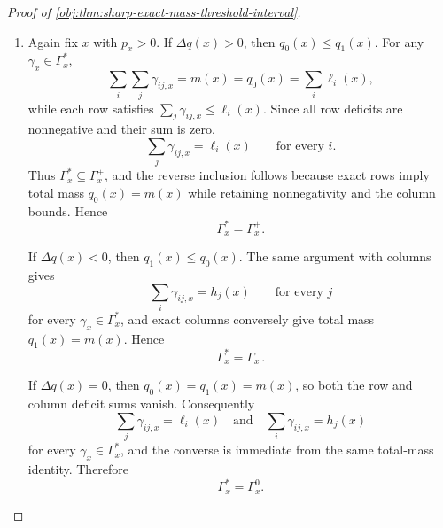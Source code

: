 \documentclass[11pt]{article}
\begin{document}
\begin{proof}[Proof of \cref{obj:thm:sharp-exact-mass-threshold-interval}]
\begin{enumerate}
Applying this proof-local realization claim to \(\widetilde\gamma\), the realized coupling in cell \(x\) is \(\gamma_x\).  Therefore the projection set of feasible full laws is exactly \(\Gamma_x^\ast\). %

\item Again fix \(x\) with \(p_x>0\).  If \(\Delta q(x)>0\), then \(q_0(x)\le q_1(x)\).  For any \(\gamma_x\in\Gamma_x^\ast\),
\[
\sum_i\sum_j\gamma_{ij,x}=m(x)=q_0(x)=\sum_i\ell_i(x),
\]
while each row satisfies \(\sum_j\gamma_{ij,x}\le \ell_i(x)\).  Since all row deficits are nonnegative and their sum is zero,
\[
\sum_j\gamma_{ij,x}=\ell_i(x)\qquad\text{for every }i.
\]
Thus \(\Gamma_x^\ast\subseteq\Gamma_x^+\), and the reverse inclusion follows because exact rows imply total mass \(q_0(x)=m(x)\) while retaining nonnegativity and the column bounds.  Hence
\[
\Gamma_x^\ast=\Gamma_x^+ .
\]

If \(\Delta q(x)<0\), then \(q_1(x)\le q_0(x)\).  The same argument with columns gives
\[
\sum_i\gamma_{ij,x}=h_j(x)\qquad\text{for every }j
\]
for every \(\gamma_x\in\Gamma_x^\ast\), and exact columns conversely give total mass \(q_1(x)=m(x)\).  Hence
\[
\Gamma_x^\ast=\Gamma_x^- .
\]

If \(\Delta q(x)=0\), then \(q_0(x)=q_1(x)=m(x)\), so both the row and column deficit sums vanish.  Consequently
\[
\sum_j\gamma_{ij,x}=\ell_i(x)\quad\text{and}\quad
\sum_i\gamma_{ij,x}=h_j(x)
\]
for every \(\gamma_x\in\Gamma_x^\ast\), and the converse is immediate from the same total-mass identity.  Therefore
\[
\Gamma_x^\ast=\Gamma_x^0 .
\] %


\end{enumerate}
\end{proof}
\end{document}
